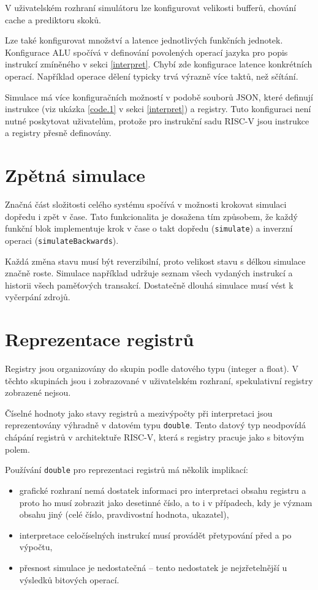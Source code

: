 V uživatelském rozhraní simulátoru lze konfigurovat velikosti bufferů, chování cache a prediktoru skoků.

Lze také konfigurovat množství a latence jednotlivých funkčních jednotek.
Konfigurace ALU spočívá v definování povolených operací jazyka pro popis instrukcí zmíněného v sekci \ref{interpret}.
Chybí zde konfigurace latence konkrétních operací.
Například operace dělení typicky trvá výrazně více taktů, než sčítání.

Simulace má více konfiguračních možností v podobě souborů JSON, které definují instrukce (viz ukázka \ref{code.1} v sekci \ref{interpret}) a registry.
Tuto konfiguraci není nutné poskytovat uživatelům, protože pro instrukční sadu RISC-V jsou instrukce a registry přesně definovány. 

\section{Zpětná simulace}

Značná část složitosti celého systému spočívá v možnosti krokovat simulaci dopředu i zpět v čase.
Tato funkcionalita je dosažena tím způsobem, že každý funkční blok implementuje krok v čase o takt dopředu (\texttt{simulate}) a inverzní operaci (\texttt{simulateBackwards}).

Každá změna stavu musí být reverzibilní, proto velikost stavu s délkou simulace značně roste.
Simulace například udržuje seznam všech vydaných instrukcí a historii všech paměťových transakcí.
Dostatečně dlouhá simulace musí vést k vyčerpání zdrojů.

\section{Reprezentace registrů}
\label{repr_reg}

Registry jsou organizovány do skupin podle datového typu (integer a float).
V těchto skupinách jsou i zobrazované v uživatelském rozhraní, spekulativní registry zobrazené nejsou.

Číselné hodnoty jako stavy registrů a mezivýpočty při interpretaci jsou reprezentovány výhradně v datovém typu \texttt{double}.
Tento datový typ neodpovídá chápání registrů v architektuře RISC-V, která s registry pracuje jako s bitovým polem.

Používání \texttt{double} pro reprezentaci registrů má několik implikací:
\begin{itemize}
    \item grafické rozhraní nemá dostatek informaci pro interpretaci obsahu registru a proto ho musí zobrazit jako desetinné číslo, a to i v případech, kdy je význam obsahu jiný (celé číslo, pravdivostní hodnota, ukazatel),
    \item interpretace celočíselných instrukcí musí provádět přetypování před a po výpočtu,
    \item přesnost simulace je nedostatečná -- tento nedostatek je nejzřetelnější u výsledků bitových operací.
\end{itemize}

